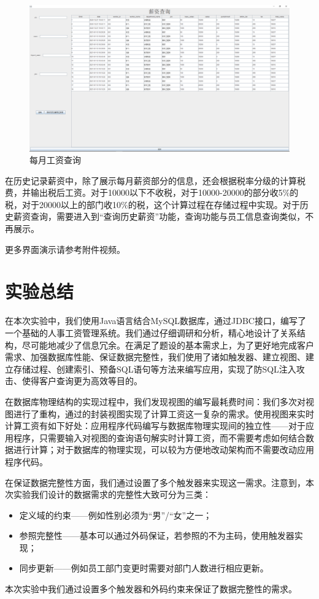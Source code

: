 \documentclass[withoutpreface,bwprint]{cumcmthesis} %
\begin{document}
\begin{figure}[H]
    \centering
    \includegraphics[width=1\linewidth]{saveSalary}
    \caption{每月工资查询}
\end{figure}
在历史记录薪资中，除了展示每月薪资部分的信息，还会根据税率分级的计算税费，并输出税后工资。对于10000以下不收税，对于10000-20000的部分收5\%的税，对于20000以上的部门收10\%的税，这个计算过程在存储过程中实现。对于历史薪资查询，需要进入到“查询历史薪资”功能，查询功能与员工信息查询类似，不再展示。\par
更多界面演示请参考附件视频。

\section{实验总结}
在本次实验中，我们使用Java语言结合MySQL数据库，通过JDBC接口，编写了一个基础的人事工资管理系统。我们通过仔细调研和分析，精心地设计了关系结构，尽可能地减少了信息冗余。在满足了题设的基本需求上，为了更好地完成客户需求、加强数据库性能、保证数据完整性，我们使用了诸如触发器、建立视图、建立存储过程、创建索引、预备SQL语句等方法来编写应用，实现了防SQL注入攻击、使得客户查询更为高效等目的。


在数据库物理结构的实现过程中，我们发现视图的编写最耗费时间：我们多次对视图进行了重构，通过的封装视图实现了计算工资这一复杂的需求。使用视图来实时计算工资有如下好处：应用程序代码编写与数据库物理实现间的独立性——对于应用程序，只需要输入对视图的查询语句解实时计算工资，而不需要考虑如何结合数据进行计算；对于数据库的物理实现，可以较为方便地改动架构而不需要改动应用程序代码。

在保证数据完整性方面，我们通过设置了多个触发器来实现这一需求。注意到，本次实验我们设计的数据需求的完整性大致可分为三类：
\begin{itemize}
\item 定义域的约束——例如性别必须为“男”/“女”之一；
\item 参照完整性——基本可以通过外码保证，若参照的不为主码，使用触发器实现；
\item 同步更新——例如员工部门变更时需要对部门人数进行相应更新。
\end{itemize}
本次实验中我们通过设置多个触发器和外码约束来保证了数据完整性的需求。
\end{document}
